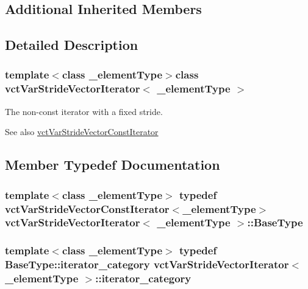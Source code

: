 \subsection*{Additional Inherited Members}


\subsection{Detailed Description}
\subsubsection*{template$<$class \+\_\+element\+Type$>$class vct\+Var\+Stride\+Vector\+Iterator$<$ \+\_\+element\+Type $>$}

The non-\/const iterator with a fixed stride. \begin{DoxySeeAlso}{See also}
\hyperlink{classvct_var_stride_vector_const_iterator}{vct\+Var\+Stride\+Vector\+Const\+Iterator} 
\end{DoxySeeAlso}


\subsection{Member Typedef Documentation}
\hypertarget{classvct_var_stride_vector_iterator_a4d9d314c1190fa1e730dce082ac1010f}{}
\subsubsection[{Base\+Type}]{\setlength{\rightskip}{0pt plus 5cm}template$<$class \+\_\+element\+Type$>$ typedef {\bf vct\+Var\+Stride\+Vector\+Const\+Iterator}$<$\+\_\+element\+Type$>$ {\bf vct\+Var\+Stride\+Vector\+Iterator}$<$ \+\_\+element\+Type $>$\+::{\bf Base\+Type}}\label{classvct_var_stride_vector_iterator_a4d9d314c1190fa1e730dce082ac1010f}
\hypertarget{classvct_var_stride_vector_iterator_a17ad751139c29df7d21eb9c05e2f391b}{}
\subsubsection[{iterator\+\_\+category}]{\setlength{\rightskip}{0pt plus 5cm}template$<$class \+\_\+element\+Type$>$ typedef Base\+Type\+::iterator\+\_\+category {\bf vct\+Var\+Stride\+Vector\+Iterator}$<$ \+\_\+element\+Type $>$\+::{\bf iterator\+\_\+category}}\label{classvct_var_stride_vector_iterator_a17ad751139c29df7d21eb9c05e2f391b}
\hypertarget{classvct_var_stride_vector_iterator_a9c3effbe4fa874856b5b295a5fec25be}{}
